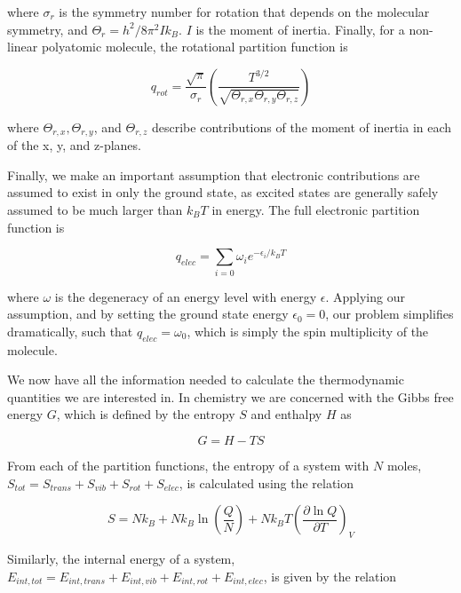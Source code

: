 \begin{doublespace}
\noindent where $\sigma_r$ is the symmetry number for rotation that depends on
the molecular symmetry, and $\Theta_r = h^2/8\pi^2Ik_B$. $I$ is the moment of
inertia. Finally, for a non-linear polyatomic molecule, the rotational
partition function is

\begin{equation}
  q_{rot} = \frac{\sqrt{\pi}}{\sigma_r}\left(\frac{T^{3/2}}{\sqrt{\Theta_{r,x}\Theta_{r,y}\Theta_{r,z}}}\right)
\end{equation}

\noindent where $\Theta_{r,x}, \Theta_{r,y}$, and $\Theta_{r,z}$ describe
contributions of the moment of inertia in each of the x, y, and z-planes.

Finally, we make an important assumption that electronic contributions are
assumed to exist in only the ground state, as excited states are generally
safely assumed to be much larger than $k_B T$ in energy. The full electronic
partition function is

\begin{equation}
  q_{elec} = \sum_{i=0} \omega_i e^{-\epsilon_i/k_B T}
\end{equation}

\noindent where $\omega$ is the degeneracy of an energy level with energy
$\epsilon$. Applying our assumption, and by setting the ground state energy
$\epsilon_0=0$, our problem simplifies dramatically, such that $q_{elec} =
\omega_0$, which is simply the spin multiplicity of the molecule.

We now have all the information needed to calculate the thermodynamic
quantities we are interested in. In chemistry we are concerned with the Gibbs
free energy $G$, which is defined by the entropy $S$ and enthalpy $H$ as

\begin{equation}
  G = H - TS
\end{equation}

\noindent From each of the partition functions, the entropy of a system with
$N$ moles, $S_{tot} = S_{trans} + S_{vib } +S_{rot} + S_{elec}$, is calculated
using the relation

\begin{equation}
  S = Nk_B + Nk_B\ln\left( \frac{Q}{N} \right) + Nk_B T \left( \frac{\partial
      \ln Q}{\partial T} \right)_V
\end{equation}

\noindent Similarly, the internal energy of a system, $E_{int,tot} =
E_{int,trans} + E_{int,vib} + E_{int,rot} + E_{int,elec}$, is given by the
relation


\end{doublespace}
